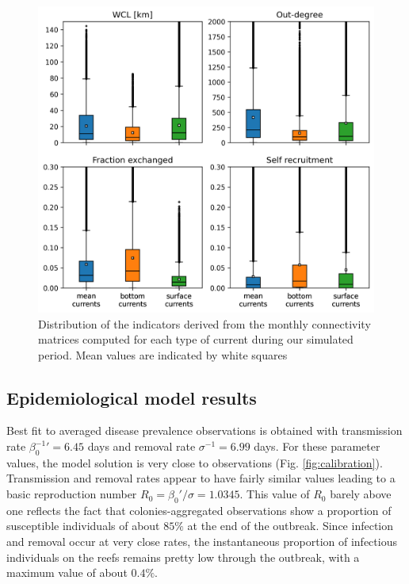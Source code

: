 \documentclass[utf8]{frontiersSCNS}
\newcommand{\dobby}[1]{\textbf{\color{violet}{#1}}}
\begin{document}
\begin{figure}
    \centering
    \includegraphics[width=.8\textwidth]{figures/connect_paper.png}
    \caption{Distribution of the indicators derived from the monthly connectivity matrices computed for each type of current during our simulated period. Mean values are indicated by white squares}
    \label{fig:connect}
\end{figure}

\subsection{Epidemiological model results}

Best fit to averaged disease prevalence observations is obtained with transmission rate $\beta_0^{-1}'=6.45$ days and removal rate $\sigma^{-1}=6.99$ days. For these parameter values, the model solution is very close to observations (Fig. \ref{fig:calibration}). Transmission and removal rates appear to have fairly similar values leading to a basic reproduction number $R_0 = \beta_0'/\sigma = 1.0345$. This value of $R_0$ barely above one reflects the fact that colonies-aggregated observations show a proportion of susceptible individuals of about $85\%$ at the end of the outbreak. Since infection and removal occur at very close rates, the instantaneous proportion of infectious individuals on the reefs remains pretty low through the outbreak, with a maximum value of about $0.4\%$.
\dobby{[I might come up with some more ideas when figures merged, as it will ease comparisons]}
\end{document}
